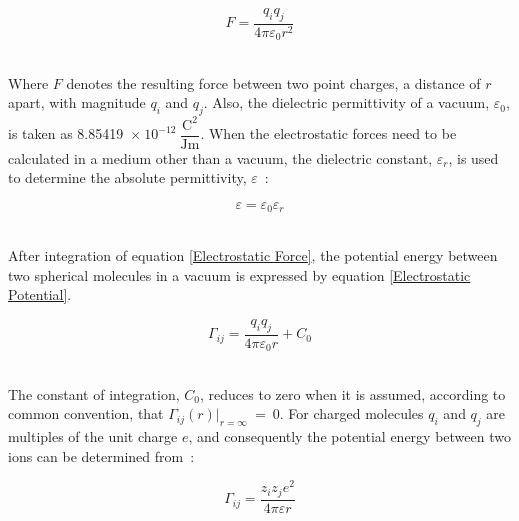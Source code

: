 \begin{equation}
F = \dfrac{q_{i}q_{j}}{4 \pi \varepsilon_{0} r^{2}} \label{Electrostatic Force}
\end{equation}\


Where $F$ denotes the resulting force between two point charges, a distance of $r$ apart, with magnitude $q_{i}$ and $q_{j}$. Also, the dielectric permittivity of a vacuum, $\varepsilon_{0}$, is taken as 8.85419~$\mathrm{\times~10^{-12}~\dfrac{C^{2}}{Jm}}$. When the electrostatic forces need to be calculated in a medium other than a vacuum, the dielectric constant, $\varepsilon_{r}$, is used to determine the absolute permittivity, $\varepsilon$~\cite{MolecularThermodynamicsOfFluidPhaseEquilibria}:\

\begin{equation}
\varepsilon = \varepsilon_{0} \varepsilon_{r}
\end{equation}\

After integration of equation \ref{Electrostatic Force}, the potential energy between two spherical molecules in a vacuum is expressed by equation \ref{Electrostatic Potential}.\

\begin{equation}
\Gamma_{ij} = \frac{q_{i}q_{j}}{4 \pi \varepsilon_{0} r} + C_{0} \label{Electrostatic Potential}
\end{equation}\

The constant of integration, $C_{0}$, reduces to zero when it is assumed, according to common convention, that $\Gamma_{ij}\left(r\right)\vert_{r =\infty}~=~0$. For charged molecules $q_{i}$ and $q_{j}$ are multiples of the unit charge $\mathit{e}$, and consequently  the potential energy between two ions can be determined from~\cite{MolecularThermodynamicsOfFluidPhaseEquilibria}:\

\begin{equation}
\Gamma_{ij} = \frac{z_{i}z_{j}\mathit{e}^{2}}{4 \pi \varepsilon r}
\end{equation}\


